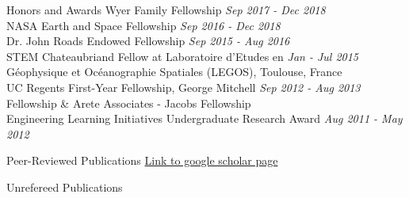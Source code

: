 \documentclass{resume} %
\begin{document}
\begin{rSection}{Honors and Awards}
Wyer Family Fellowship \hfill {\em Sep 2017 - Dec 2018} \\
NASA Earth and Space Fellowship \hfill {\em Sep 2016 - Dec 2018} \\
Dr. John Roads Endowed Fellowship \hfill {\em Sep 2015 - Aug 2016} \\
STEM Chateaubriand Fellow at Laboratoire d’Etudes en \hfill {\em Jan - Jul 2015} \\
G\'eophysique et Oc\'eanographie Spatiales (LEGOS), Toulouse, France \\
UC Regents First-Year Fellowship, George Mitchell \hfill {\em Sep 2012 - Aug 2013} \\
Fellowship \& Arete Associates - Jacobs Fellowship \\
Engineering Learning Initiatives Undergraduate Research Award \hfill {\em Aug 2011 - May 2012}
\end{rSection}

\begin{rSection}{Peer-Reviewed Publications}
\href{https://scholar.google.com/citations?user=UGkNcW8AAAAJ&hl=en&oi=sra}{Link to google scholar page}
\begingroup
\renewcommand{\section}[2]{}
\endgroup
\end{rSection}

\begin{rSection}{Unrefereed Publications}
\begingroup
\renewcommand{\section}[2]{}
\endgroup
\end{rSection}
\end{document}
